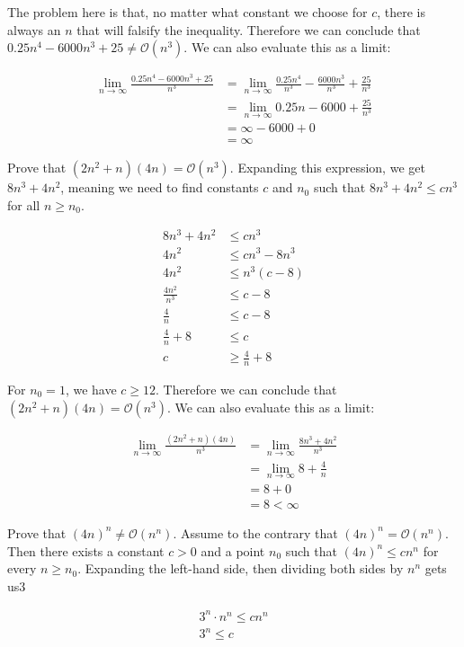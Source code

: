 The problem here is that, no matter what constant we choose for $c$, there is always an $n$ that will falsify the inequality. Therefore we can conclude that $0.25n^4 - 6000n^3 + 25 \neq \mathcal{O}(n^3)$. We can also evaluate this as a limit:

\begin{align*}
  \lim_{n \to \infty} \frac{0.25n^4 - 6000n^3 + 25}{n^3} &= \lim_{n \to \infty} \frac{0.25n^4}{n^3} - \frac{6000n^3}{n^3} + \frac{25}{n^3}\\
  &= \lim_{n \to \infty} 0.25n - 6000 + \frac{25}{n^3}\\
  &= \infty - 6000 + 0\\
  &= \infty
\end{align*}

\example Prove that $(2n^2 + n)(4n) = \mathcal{O}(n^3)$. Expanding this expression, we get $8n^3 + 4n^2$, meaning we need to find constants $c$ and $n_0$ such that $8n^3 + 4n^2 \leq cn^3$ for all $n\geq n_0$.

\begin{align*}
  8n^3 + 4n^2 &\leq cn^3\\
  4n^2 &\leq cn^3 - 8n^3\\
  4n^2 &\leq n^3(c - 8)\\
  \frac{4n^2}{n^3} &\leq c - 8\\
  \frac{4}{n} &\leq c - 8\\
  \frac{4}{n} + 8 &\leq c\\
  c &\geq \frac{4}{n} + 8
\end{align*}

For $n_0 = 1$, we have $c \geq 12$. Therefore we can conclude that $(2n^2 + n)(4n) = \mathcal{O}(n^3)$. We can also evaluate this as a limit:

\begin{align*}
  \lim_{n \to \infty} \frac{(2n^2 + n)(4n)}{n^3} &= \lim_{n \to \infty} \frac{8n^3 + 4n^2}{n^3}\\
  &= \lim_{n \to \infty} 8 + \frac{4}{n}\\
  &= 8 + 0\\
  &= 8 < \infty
\end{align*}

\example Prove that $(4n)^n \neq \mathcal{O}(n^n)$. Assume to the contrary that $(4n)^n = \mathcal{O}(n^n)$. Then there exists a constant $c > 0$ and a point $n_0$ such that $(4n)^n \leq cn^n$ for every $n \geq n_0$. Expanding the left-hand side, then dividing both sides by $n^n$ gets us3

\begin{align*}
  3^n \cdot n^n \leq cn^n\\
  3^n \leq c
\end{align*}


